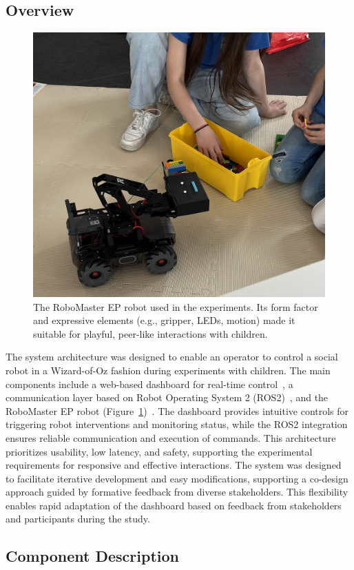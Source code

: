 \documentclass[a4paper]{usiinfbachelorproject}
\begin{document}
\subsection*{\textbf{Overview}}
\begin{figure}[H]
    \centering
    \includegraphics[width=0.6\linewidth]{figures/robot_closeup.jpg}
    \caption{The RoboMaster EP robot used in the experiments. Its form factor and expressive elements (e.g., gripper, LEDs, motion) made it suitable for playful, peer-like interactions with children.}
    \label{fig:robot-closeup}
\end{figure}
The system architecture was designed to enable an operator to control a social robot in a Wizard-of-Oz fashion during experiments with children.
The main components include a web-based dashboard for real-time control~\cite{frovaaa2025hogwarts}, a communication layer based on Robot Operating System 2 (ROS2)~\cite{ros2, frovaaa2025robomaster, frovaaa2025robomasterhri}, and the RoboMaster EP robot (Figure~\ref{fig:robot-closeup})~\cite{djirobomasterep}.
The dashboard provides intuitive controls for triggering robot interventions and monitoring status, while the ROS2 integration ensures reliable communication and execution of commands.
This architecture prioritizes usability, low latency, and safety, supporting the experimental requirements for responsive and effective interactions.
The system was designed to facilitate iterative development and easy modifications, supporting a co-design approach guided by formative feedback from diverse stakeholders.
This flexibility enables rapid adaptation of the dashboard based on feedback from stakeholders and participants during the study.

\subsection{\textbf{Component Description}}
\end{document}
